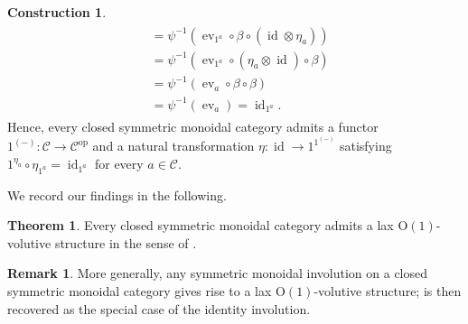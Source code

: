 \documentclass{article}
\newcommand{\opp}{\operatorname{op}}%
\newcommand{\id}{\operatorname{id}}%
\newcommand{\ev}{\operatorname{ev}}%
\newcommand{\Oone}{\operatorname{O(1)}}
\newcommand{\C}{\mathcal{C}}
\numberwithin{equation}{section}
\theoremstyle{definition}
\newtheorem{construction}[definition]{Construction}
\newtheorem{remark}[definition]{Remark}
\theoremstyle{theorem}
\newtheorem{theorem}[definition]{Theorem}
\begin{document}
\begin{construction}
\begin{align}
\begin{split}
            &= \psi^{-1}(\ev_{1^a} \circ \beta \circ (\id \otimes \eta_a)) \\
            &= \psi^{-1}(\ev_{1^a} \circ (\eta_a \otimes \id) \circ \beta) \\
            &= \psi^{-1}(\ev_a \circ \beta \circ \beta) \\ %
            &= \psi^{-1}(\ev_a)  %
            = \id_{1^a}. %
        \end{split}
    \end{align}
    Hence, every closed symmetric monoidal category admits a functor $1^{(-)} \colon \C \to \C^{\opp}$ and a natural transformation $\eta \colon \id \to 1^{1^{(-)}}$ satisfying $1^{\eta_a} \circ \eta_{1^a} = \id_{1^a}$ for every $a \in \C$. 
\end{construction}
We record our findings in the following.
\begin{theorem}\label{Theorem: closed symmetric monoidal categories are lax volutive}
    Every closed symmetric monoidal category admits a lax $\Oone$-volutive structure in the sense of .
\end{theorem}
\begin{remark}
    More generally, any symmetric monoidal involution on a closed symmetric monoidal category gives rise to a lax $\Oone$-volutive structure; 
     is then recovered as the special case of the identity involution. 
\end{remark}
\end{document}
